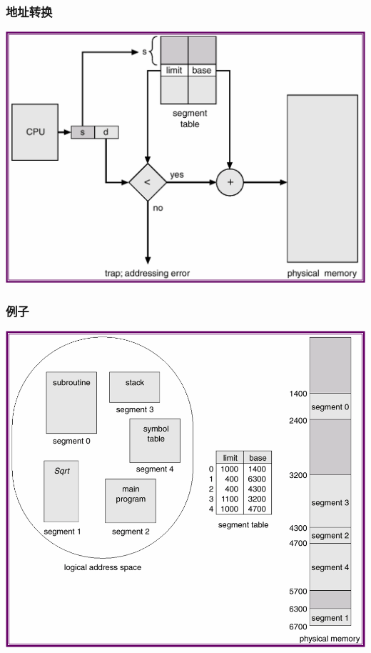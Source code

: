 \documentclass[CJKutf8,xcolor=pdftex,dvipsnames,table]{beamer}
\begin{document}
\begin{CJK*}{UTF8}{song}
  \begin{frame}
  \frametitle{地址转换} \pause
  \begin{center}
    \includegraphics[scale=.5]{v6f9-18}
  \end{center}
  \end{frame}
  
  \begin{frame}
  \frametitle{例子} \pause
  \begin{center}
    \includegraphics[scale=.5]{v6f9-19}
  \end{center}
  \end{frame}
  

\end{CJK*}
\end{document}

